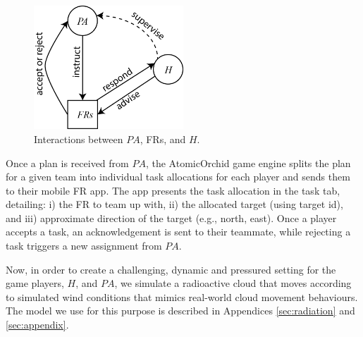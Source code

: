 \begin{figure}[htbp]\centering
\includegraphics[width=0.5\textwidth]{agent-planner.png}
\caption{Interactions between $PA$, FRs, and $H$.}
\label{fig:arch}
\end{figure}
Once a plan is received from $PA$, the AtomicOrchid game engine splits the plan for a given team into individual task allocations for each player and sends them to their mobile FR app. The app presents the task allocation in the task tab, detailing: i) the FR to team up with, ii) the allocated target (using target id), and iii) approximate direction of the target (e.g., north, east).  Once a player accepts a task, an acknowledgement is sent to their teammate, while rejecting a task triggers a new assignment from $PA$. 


Now, in order to create a challenging, dynamic and pressured setting for the game players, $H$, and $PA$, we simulate a radioactive cloud that moves according to simulated wind conditions that mimics real-world cloud movement behaviours. The model we use for this purpose is described in Appendices \ref{sec:radiation} and \ref{sec:appendix}.


